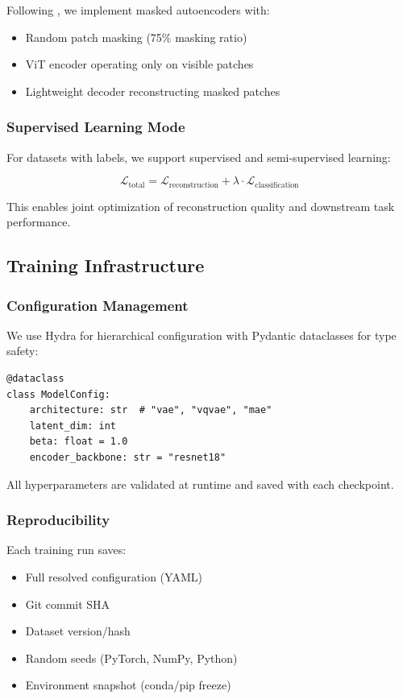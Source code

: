 Following \citet{he2022masked}, we implement masked autoencoders with:
\begin{itemize}
    \item Random patch masking (75\% masking ratio)
    \item ViT encoder operating only on visible patches
    \item Lightweight decoder reconstructing masked patches
\end{itemize}

\subsubsection{Supervised Learning Mode}

For datasets with labels, we support supervised and semi-supervised learning:

\begin{equation}
\mathcal{L}_{\text{total}} = \mathcal{L}_{\text{reconstruction}} + \lambda \cdot \mathcal{L}_{\text{classification}}
\end{equation}

This enables joint optimization of reconstruction quality and downstream task performance.

\subsection{Training Infrastructure}

\subsubsection{Configuration Management}

We use Hydra for hierarchical configuration with Pydantic dataclasses for type safety:

\begin{verbatim}
@dataclass
class ModelConfig:
    architecture: str  # "vae", "vqvae", "mae"
    latent_dim: int
    beta: float = 1.0
    encoder_backbone: str = "resnet18"
\end{verbatim}

All hyperparameters are validated at runtime and saved with each checkpoint.

\subsubsection{Reproducibility}

Each training run saves:
\begin{itemize}
    \item Full resolved configuration (YAML)
    \item Git commit SHA
    \item Dataset version/hash
    \item Random seeds (PyTorch, NumPy, Python)
    \item Environment snapshot (conda/pip freeze)
\end{itemize}

